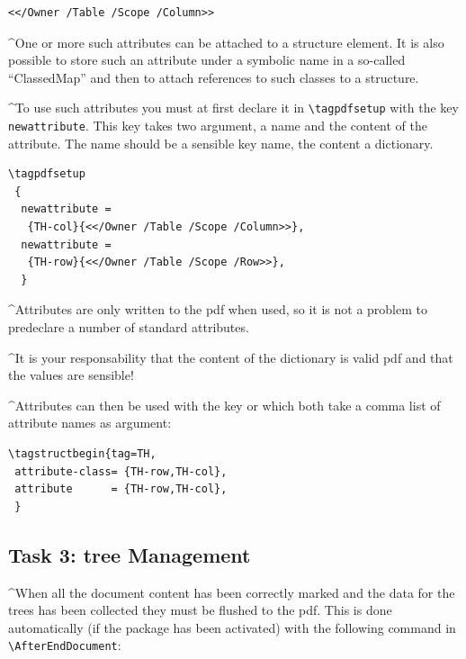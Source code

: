 \documentclass[DIV=12,parskip=half-,bibliography=totoc]{scrartcl}
\begin{document}
\begin{lstlisting}
<</Owner /Table /Scope /Column>>
\end{lstlisting}
\tagmcend\tagstructend

\TagP^One or more such attributes can be attached to a structure element. It is also possible to store such an attribute under a symbolic name in a so-called \enquote{ClassedMap} and then to attach references to such classes to a structure.\TagPend

\TagP^To use such attributes you must at first declare it in \verb+\tagpdfsetup+ with the key \texttt{newattribute}. This key takes two argument, a name and the content of the attribute.
The name should be a sensible key name, the content a dictionary.
\TagPend

\begin{lstlisting}
\tagpdfsetup
 {
  newattribute =
   {TH-col}{<</Owner /Table /Scope /Column>>},
  newattribute =
   {TH-row}{<</Owner /Table /Scope /Row>>},
  }
\end{lstlisting}
\tagmcend\tagstructend


\TagP^Attributes are only written to the pdf when used, so it is not a problem to predeclare a number of standard attributes.
\TagPend

\TagP^It is your responsability that the content of the dictionary is valid pdf and that the values are sensible!
\TagPend

\TagP^Attributes can then be used with the key  or  which both take a comma list of attribute names as argument:
\TagPend

\begin{lstlisting}
\tagstructbegin{tag=TH,
 attribute-class= {TH-row,TH-col},
 attribute      = {TH-row,TH-col},
 }
\end{lstlisting}
\tagmcend\tagstructend


\subsection{Task 3: tree Management}
\TagP^When all the document content has been correctly marked and the data for the trees has been collected they must be flushed to the pdf. This is done automatically (if the package has been activated) with the following command in \verb+\AfterEndDocument+:\TagPend
\end{document}
